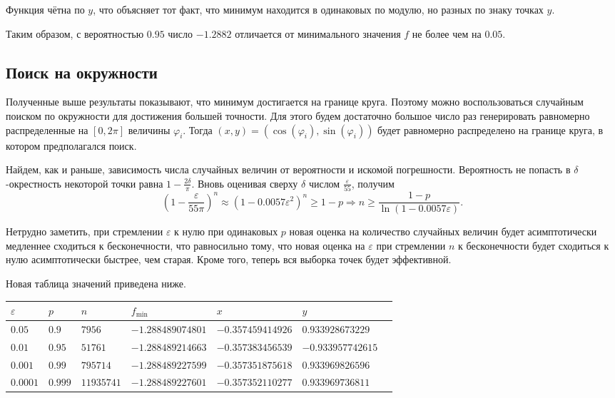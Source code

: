 \documentclass[12pt, a4paper]{article}
\begin{document}
Функция чётна по $y$, что объясняет тот факт, что минимум находится в одинаковых по модулю, но разных по знаку точках $y$.

Таким образом, с вероятностью $0.95$ число $-1.2882$ отличается от минимального значения $f$ не более чем на $0.05$.

\subsection{Поиск на окружности}
Полученные выше результаты показывают, что минимум достигается на границе круга. Поэтому можно воспользоваться случайным поиском по окружности для достижения большей точности. Для этого будем достаточно большое число раз генерировать равномерно распределенные на $\left[ 0, 2\pi \right]$ величины $\varphi_i$. Тогда $(x,y) = \left(\cos(\varphi_i),\sin\left(\varphi_i\right)\right)$ будет равномерно распределено на границе круга, в котором предполагался поиск. 

Найдем, как и раньше, зависимость числа случайных величин от вероятности и искомой погрешности. Вероятность не попасть в $\delta$-окрестность некоторой точки равна $1-\frac{2\delta}{\pi}$. Вновь оценивая сверху $\delta$ числом $\frac{\varepsilon}{55}$, получим 
 \[ \left(1-\frac{\varepsilon}{55\pi}\right)^n \approx \left( 1-0.0057\varepsilon^2 \right) ^n \geqslant 1-p \Rightarrow  n \geqslant \frac{1-p}{\ln\left( 1-0.0057\varepsilon \right) }.\] 
 
 Нетрудно заметить, при стремлении $\varepsilon$ к нулю при одинаковых $p$ новая оценка на количество случайных величин будет асимптотически медленнее сходиться к бесконечности, что равносильно тому, что новая оценка на $\varepsilon$ при стремлении $n$ к бесконечности будет сходиться к нулю асимптотически быстрее, чем старая. Кроме того, теперь вся выборка точек будет эффективной.

Новая таблица значений приведена ниже.

\begin{tabular}{|l|l|l|l|l|l|l|}
\hline
$\varepsilon$ & $p$ & $n$ & $f_{\min}$ &$x$& $y$ \\
\hline
$0.05$ & $0.9$ & $7956$ & $-1.288489074801$ & $-0.357459414926$ & $0.933928673229$ \\
$0.01$ & $0.95$ & $51761$ & $-1.288489214663$ & $-0.357383456539$ & $-0.933957742615$ \\
$0.001$ & $0.99$ & $795714$ & $-1.288489227599$ & $-0.357351875618$ & $0.933969826596$ \\
$0.0001$ & $0.999$ & $11935741$ & $-1.288489227601$ & $-0.357352110277$ & $0.933969736811$ \\
\hline
\end{tabular}
\end{document}
